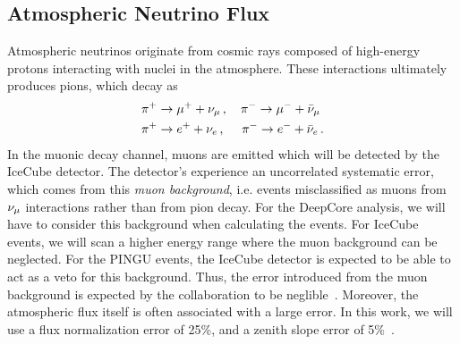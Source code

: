 \subsection{Atmospheric Neutrino Flux}
Atmospheric neutrinos originate from cosmic rays composed of high-energy protons interacting with nuclei in the atmosphere.
These interactions ultimately produces pions, which decay as 
\begin{align}\label{eq:pion}
    &\pi^+ \to \mu^+ + \nu_\mu\,, \quad \pi^- \to \mu^- + \bar{\nu}_\mu \nonumber \\
    &\pi^+ \to e^+ + \nu_e\,,\,\, \quad \pi^- \to e^- + \bar{\nu}_e\,.
\end{align}
In the muonic decay channel, muons are emitted which will be detected by the IceCube detector.
The detector's experience an uncorrelated systematic error, which comes from this \emph{muon background}, 
i.e. events misclassified as muons from 
$\nu_\mu$ interactions rather than from pion decay. For the DeepCore analysis, we will have to consider this background when calculating the events.
For IceCube events, we will scan a higher energy range where the muon background can be neglected. For the PINGU events, the IceCube detector is 
expected to be able to act as a veto for this background. Thus, the error introduced from the muon background is expected by the collaboration 
to be neglible~\cite{PINGUletter}.
Moreover, the atmospheric flux itself is often associated with a large error.
In this work, we will use a flux normalization error of 25\%, and a zenith slope error of 5\%~\cite{hondapaper}.

